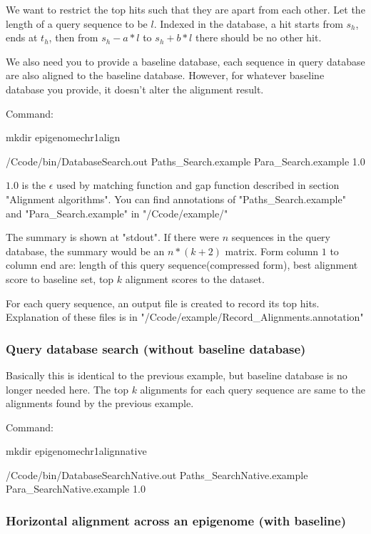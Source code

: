 \documentclass[a4paper]{article}
\begin{document}
\begin{CJK*}{UTF8}{kai}
We want to restrict the top hits such that they are apart from each other. Let the length of a query sequence to be $l$. Indexed in the database, a hit starts from $s_h$, ends at $t_h$, then from $s_h-a*l$ to $s_h+b*l$ there should be no other hit. 

We also need you to provide a baseline database, each sequence in query database are also aligned to the baseline database. However, for whatever baseline database you provide, it doesn't alter the alignment result.

Command:

mkdir epigenomechr1align

/Ccode/bin/DatabaseSearch.out Paths\_Search.example Para\_Search.example 1.0

$1.0$ is the $\epsilon$ used by matching function and gap function described in section "Alignment algorithms". You can find annotations of "Paths\_Search.example" and "Para\_Search.example" in "/Ccode/example/"

The summary is shown at "stdout". If there were $n$ sequences in the query database, the summary would be an $n*(k+2)$ matrix. Form column $1$ to column end are: length of this query sequence(compressed form), best alignment score to baseline set, top $k$ alignment scores to the dataset. 

For each query sequence, an output file is created to record its top hits. Explanation of these files is in "/Ccode/example/Record\_Alignments.annotation"

\subsubsection{Query database search (without baseline database)}

Basically this is identical to the previous example, but baseline database is no longer needed here. The top $k$ alignments for each query sequence are same to the alignments found by the previous example.

Command:

mkdir epigenomechr1alignnative

/Ccode/bin/DatabaseSearchNative.out Paths\_SearchNative.example Para\_SearchNative.example 1.0

\subsubsection{Horizontal alignment across an epigenome (with baseline)}


\end{CJK*}
\end{document}
